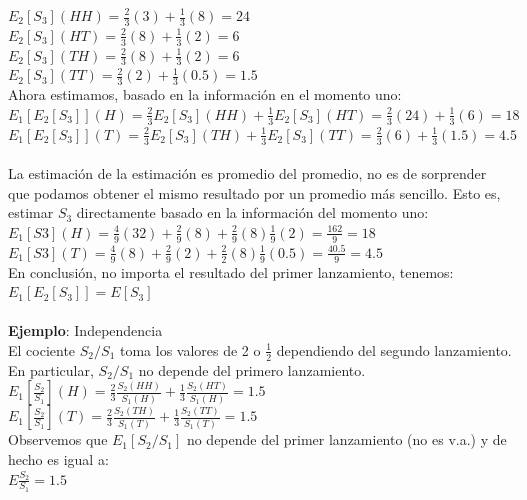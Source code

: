 \documentclass{article}
\begin{document}
        $E_2[S_3](HH) = \frac{2}{3} (3) + \frac{1}{3} (8) = 24$
        \\
        $E_2[S_3](HT) = \frac{2}{3} (8) + \frac{1}{3} (2) = 6$
        \\
        $E_2[S_3](TH) = \frac{2}{3} (8) + \frac{1}{3} (2) = 6$
        \\
        $E_2[S_3](TT) = \frac{2}{3} (2) + \frac{1}{3} (0.5) = 1.5$
        \\
        Ahora estimamos, basado en la información en el momento uno:
        \\
        $E_1[E_2[S_3]](H) = \frac{2}{3} E_2[S_3](HH) + \frac{1}{3} E_2[S_3](HT) = \frac{2}{3}(24) + \frac{1}{3} (6) = 18$
        \\
        $E_1[E_2[S_3]](T) = \frac{2}{3} E_2[S_3](TH) + \frac{1}{3} E_2[S_3](TT) = \frac{2}{3}(6) + \frac{1}{3} (1.5) = 4.5$
        \\
        \\
        La estimación de la estimación es promedio del promedio, no es de sorprender que podamos obtener el mismo resultado por un promedio más sencillo.
        Esto es, estimar $S_3$ directamente basado en la información del momento uno:
        \\
        $E_1[S3](H) = \frac{4}{9} (32) + \frac{2}{9} (8) + \frac{2}{9} (8) \frac{1}{9} (2) = \frac{162}{9} = 18$
        $E_1[S3](T) = \frac{4}{9} (8) + \frac{2}{9} (2) + \frac{2}{2} (8) \frac{1}{9} (0.5) = \frac{40.5}{9} = 4.5$
        \\
        En conclusión, no importa el resultado del primer lanzamiento, tenemos:
        \\
        $E_1[E_2[S_3]] = E[S_3]$
        \\
        \\
        \textbf{Ejemplo}: Independencia
        \\
        El cociente $S_2 / S_1$ toma los valores de 2 o $\frac{1}{2}$ dependiendo del segundo lanzamiento. En particular, $S_2 / S_1$ no depende del primero lanzamiento.
        \\
        $E_1[\frac{S_2}{S_1}](H) = \frac{2}{3} \frac{S_2(HH)}{S_1(H)} + \frac{1}{3} \frac{S_2(HT)}{S_1(H)} = 1.5$
        \\
        $E_1[\frac{S_2}{S_1}](T) = \frac{2}{3} \frac{S_2(TH)}{S_1(T)} + \frac{1}{3} \frac{S_2(TT)}{S_1(T)} = 1.5$
        \\
        Observemos que $E_1[S_2 / S_1]$ no depende del primer lanzamiento (no es v.a.) y de hecho es igual a:
        \\
        $E \frac{S_2}{S_1} = 1.5$
\end{document}
